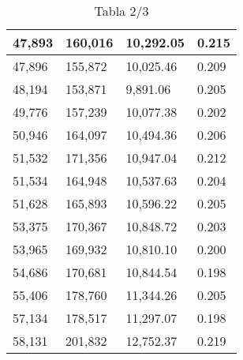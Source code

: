 \begin{table}[H]
{\begin{tabular}{| l | l | l |l |}
47,893	&	160,016	&	10,292.05	&	0.215	\\ \hline
47,896	&	155,872	&	10,025.46	&	0.209	\\ \hline
48,194	&	153,871	&	9,891.06	&	0.205	\\ \hline
49,776	&	157,239	&	10,077.38	&	0.202	\\ \hline
50,946	&	164,097	&	10,494.36	&	0.206	\\ \hline
51,532	&	171,356	&	10,947.04	&	0.212	\\ \hline
51,534	&	164,948	&	10,537.63	&	0.204	\\ \hline
51,628	&	165,893	&	10,596.22	&	0.205	\\ \hline
53,375	&	170,367	&	10,848.72	&	0.203	\\ \hline
53,965	&	169,932	&	10,810.10	&	0.200	\\ \hline
54,686	&	170,681	&	10,844.54	&	0.198	\\ \hline
55,406	&	178,760	&	11,344.26	&	0.205	\\ \hline
57,134	&	178,517	&	11,297.07	&	0.198	\\ \hline
58,131	&	201,832	&	12,752.37	&	0.219	\\ \hline


  \end{tabular}
   \caption*{Tabla 2/3}
}
\end{table}

